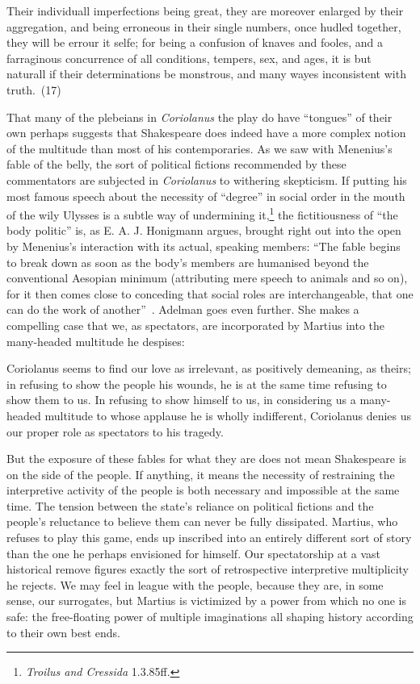 \begin{bq}
Their individuall imperfections being great, they are moreover enlarged by their aggregation, and being erroneous in their single numbers, once hudled together, they will be errour it selfe; for being a confusion of knaves and fooles, and a farraginous concurrence of all conditions, tempers, sex, and ages, it is but naturall if their determinations be monstrous, and many wayes inconsistent with truth.~(17)
\end{bq}
That many of the plebeians in \emph{Coriolanus} the play do have ``tongues'' of their own perhaps suggests that Shakespeare does indeed have a more complex notion of the multitude than most of his contemporaries.
As we saw with Menenius's fable of the belly, the sort of political fictions recommended by these commentators are subjected in \emph{Coriolanus} to withering skepticism.
If putting his most famous speech about the necessity of ``degree'' in social order in the mouth of the wily Ulysses is a subtle way of undermining it,\footnote{\emph{Troilus and Cressida} 1.3.85ff.} the fictitiousness of ``the body politic'' is, as E. A. J. Honigmann argues, brought right out into the open by Menenius's interaction with its actual, speaking members: ``The fable begins to break down as soon as the body's members are humanised beyond the conventional Aesopian minimum (attributing mere speech to animals and so on), for it then comes close to conceding that social roles are interchangeable, that one can do the work of another''~\cite[179]{honigmann_shakespeare:_2002}.
Adelman goes even further.
She makes a compelling case that we, as spectators, are incorporated by Martius into the many-headed multitude he despises:
\begin{bq}
Coriolanus seems to find our love as irrelevant, as positively demeaning, as theirs; in refusing to show the people his wounds, he is at the same time refusing to show them to us.
In refusing to show himself to us, in considering us a many-headed multitude to whose applause he is wholly indifferent, Coriolanus denies us our proper role as spectators to his tragedy.~\cite[144]{adelman_angers_1980}
\end{bq}
But the exposure of these fables for what they are does not mean Shakespeare is on the side of the people.
If anything, it means the necessity of restraining the interpretive activity of the people is both necessary and impossible at the same time.
The tension between the state's reliance on political fictions and the people's reluctance to believe them can never be fully dissipated.
Martius, who refuses to play this game, ends up inscribed into an entirely different sort of story than the one he perhaps envisioned for himself.
Our spectatorship at a vast historical remove figures exactly the sort of retrospective interpretive multiplicity he rejects.
We may feel in league with the people, because they are, in some sense, our surrogates, but Martius is victimized by a power from which no one is safe: the free-floating power of multiple imaginations all shaping history according to their own best ends.

